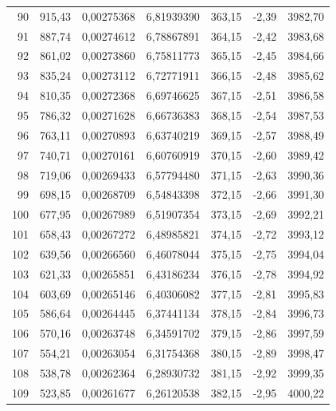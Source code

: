 \documentclass[12pt,a4paper,final,twoside,fleqn]{article}
\begin{document}
\begin{ThreePartTable}
\begin{longtable}{rrrrrrr}
90           & 915,43    & 0,00275368    & 6,81939390  & 363,15     & -2,39      & 3982,70 \\
91           & 887,74    & 0,00274612    & 6,78867891  & 364,15     & -2,42      & 3983,68 \\
92           & 861,02    & 0,00273860    & 6,75811773  & 365,15     & -2,45      & 3984,66 \\
93           & 835,24    & 0,00273112    & 6,72771911  & 366,15     & -2,48      & 3985,62 \\
94           & 810,35    & 0,00272368    & 6,69746625  & 367,15     & -2,51      & 3986,58 \\
95           & 786,32    & 0,00271628    & 6,66736383  & 368,15     & -2,54      & 3987,53 \\
96           & 763,11    & 0,00270893    & 6,63740219  & 369,15     & -2,57      & 3988,49 \\
97           & 740,71    & 0,00270161    & 6,60760919  & 370,15     & -2,60      & 3989,42 \\
98           & 719,06    & 0,00269433    & 6,57794480  & 371,15     & -2,63      & 3990,36 \\
99           & 698,15    & 0,00268709    & 6,54843398  & 372,15     & -2,66      & 3991,30 \\
100          & 677,95    & 0,00267989    & 6,51907354  & 373,15     & -2,69      & 3992,21 \\
101          & 658,43    & 0,00267272    & 6,48985821  & 374,15     & -2,72      & 3993,12 \\
102          & 639,56    & 0,00266560    & 6,46078044  & 375,15     & -2,75      & 3994,04 \\
103          & 621,33    & 0,00265851    & 6,43186234  & 376,15     & -2,78      & 3994,92 \\
104          & 603,69    & 0,00265146    & 6,40306082  & 377,15     & -2,81      & 3995,83 \\
105          & 586,64    & 0,00264445    & 6,37441134  & 378,15     & -2,84      & 3996,73 \\
106          & 570,16    & 0,00263748    & 6,34591702  & 379,15     & -2,86      & 3997,59 \\
107          & 554,21    & 0,00263054    & 6,31754368  & 380,15     & -2,89      & 3998,47 \\
108          & 538,78    & 0,00262364    & 6,28930732  & 381,15     & -2,92      & 3999,35 \\
109          & 523,85    & 0,00261677    & 6,26120538  & 382,15     & -2,95      & 4000,22 \\

\end{longtable}
\end{ThreePartTable}
\end{document}
